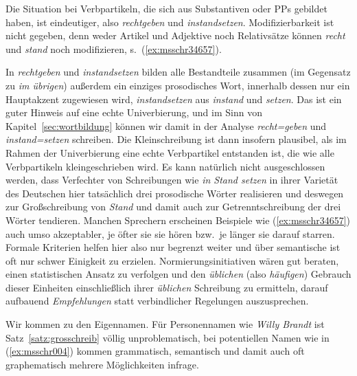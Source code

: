 Die Situation bei Verbpartikeln, die sich aus Substantiven oder PPs gebildet haben, ist eindeutiger, also \zB \textit{rechtgeben} und \textit{instandsetzen}.
Modifizierbarkeit ist nicht gegeben, denn weder Artikel und Adjektive noch Relativsätze können \textit{recht} und \textit{stand} noch modifizieren, s.\ (\ref{ex:msschr34657}).

\begin{exe}
  \ex\label{ex:msschr34657}
  \begin{xlist}
  \end{xlist}
\end{exe}

In \textit{rechtgeben} und \textit{instandsetzen} bilden alle Bestandteile zusammen (im Gegensatz zu \textit{im übrigen}) außerdem ein einziges prosodisches Wort, innerhalb dessen nur ein Hauptakzent zugewiesen wird, \zB \textit{in\Akz standsetzen} aus \textit{in\Akz stand} und \textit{\Akz setzen}.
Das ist ein guter Hinweis auf eine echte Univerbierung, und im Sinn von Kapitel~\ref{sec:wortbildung} können wir damit in der Analyse \textit{recht=geben} und \textit{instand=setzen} schreiben.
Die Kleinschreibung ist dann insofern plausibel, als im Rahmen der Univerbierung eine echte Verbpartikel entstanden ist, die wie alle Verbpartikeln kleingeschrieben wird.
Es kann natürlich nicht ausgeschlossen werden, dass Verfechter von Schreibungen wie \textit{in Stand setzen} in ihrer Varietät des Deutschen hier tatsächlich drei prosodische Wörter realisieren und deswegen zur Großschreibung von \textit{Stand} und damit auch zur Getrenntschreibung der drei Wörter tendieren.
Manchen Sprechern erscheinen Beispiele wie (\ref{ex:msschr34657}) auch umso akzeptabler, je öfter sie sie hören bzw.\ je länger sie darauf starren.
Formale Kriterien helfen hier also nur begrenzt weiter und über semantische ist oft nur schwer Einigkeit zu erzielen.
Normierungsinitiativen wären gut beraten, einen statistischen Ansatz zu verfolgen und den \textit{üblichen} (also \textit{häufigen}) Gebrauch dieser Einheiten einschließlich ihrer \textit{üblichen} Schreibung zu ermitteln, darauf aufbauend \textit{Empfehlungen} statt verbindlicher Regelungen auszusprechen.

Wir kommen zu den Eigennamen.
Für Personennamen wie \textit{Willy Brandt} ist Satz~\ref{satz:grosschreib} völlig unproblematisch, bei potentiellen Namen wie in (\ref{ex:msschr004}) kommen grammatisch, semantisch und damit auch oft graphematisch mehrere Möglichkeiten infrage.

